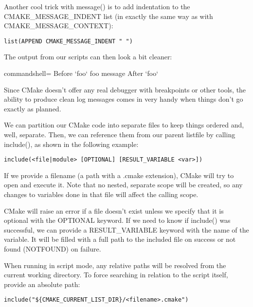 Another cool trick with message() is to add indentation to the CMAKE\_MESSAGE\_INDENT list (in exactly the same way as with CMAKE\_MESSAGE\_CONTEXT):

\begin{lstlisting}[style=styleCMake]
list(APPEND CMAKE_MESSAGE_INDENT " ")
\end{lstlisting}

The output from our scripts can then look a bit cleaner:

\begin{tcblisting}{commandshell={}}
Before `foo`
  foo message
After `foo`
\end{tcblisting}

Since CMake doesn't offer any real debugger with breakpoints or other tools, the ability to produce clean log messages comes in very handy when things don't go exactly as planned.


We can partition our CMake code into separate files to keep things ordered and, well, separate. Then, we can reference them from our parent listfile by calling include(), as shown in the following example:

\begin{lstlisting}[style=styleCMake]
include(<file|module> [OPTIONAL] [RESULT_VARIABLE <var>])
\end{lstlisting}

If we provide a filename (a path with a .cmake extension), CMake will try to open and execute it. Note that no nested, separate scope will be created, so any changes to variables done in that file will affect the calling scope.

CMake will raise an error if a file doesn't exist unless we specify that it is optional with the OPTIONAL keyword. If we need to know if include() was successful, we can provide a RESULT\_VARIABLE keyword with the name of the variable. It will be filled with a full path to the included file on success or not found (NOTFOUND) on failure.

When running in script mode, any relative paths will be resolved from the current working directory. To force searching in relation to the script itself, provide an absolute path:

\begin{lstlisting}[style=styleCMake]
include("${CMAKE_CURRENT_LIST_DIR}/<filename>.cmake")
\end{lstlisting}

